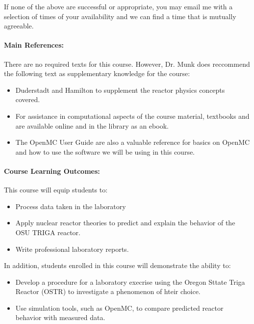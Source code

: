 \documentclass[11pt, a4paper]{article}
\begin{document}
If none of the above are successful or appropriate, you may email me with a
selection of times of your availability and we can find a time that is mutually
agreeable.

\paragraph{Main References:}
There are no required texts for this course. However, Dr. Munk does reccommend the following text as supplementary knowledge for the course:
\begin{itemize}
\item Duderstadt and Hamilton \cite{duderstadt_nuclear_1976} to supplement the reactor physics concepts covered. 
\item For assistance in computational aspects of the course material, textbooks \cite{mcclarren_computational_2017} and \cite{scopatz_effective_2015} are available online and in the library as an ebook.
\item The OpenMC User Guide \cite{openmcdocs} are also a valuable reference for basics on OpenMC and how to use the software we will be using in this course. 
\end{itemize}



\renewcommand{\refname}{\normalfont\selectfont\normalsize}\vspace{-1cm}


\paragraph{Course Learning Outcomes:}

This course will equip students to:
\begin{itemize}
\item Process data taken in the laboratory
\item Apply nuclear reactor theories to predict and explain the behavior of the OSU TRIGA reactor. 
\item Write professional laboratory reports. 
\end{itemize}

In addition, students enrolled in this course will demonstrate the ability to:

\begin{itemize}
\item Develop a procedure for a laboratory execrise using the Oregon Sttate Triga Reactor (OSTR) to investigate a phenomenon of hteir choice.
\item Use simulation tools, such as OpenMC, to compare predicted reactor behavior with measured data. 
\end{itemize}
\end{document}
